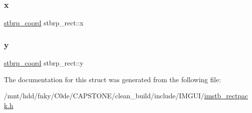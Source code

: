 \subsubsection{\texorpdfstring{x}{x}}
{\footnotesize\ttfamily \hyperlink{imstb__rectpack_8h_a4a396a45893c12de32e2d598abd6b302}{stbrp\+\_\+coord} stbrp\+\_\+rect\+::x}

\mbox{\label{structstbrp__rect_ae3034c1fbf86043b568f5a4dddf946fa}} 
\subsubsection{\texorpdfstring{y}{y}}
{\footnotesize\ttfamily \hyperlink{imstb__rectpack_8h_a4a396a45893c12de32e2d598abd6b302}{stbrp\+\_\+coord} stbrp\+\_\+rect\+::y}



The documentation for this struct was generated from the following file\+:\begin{DoxyCompactItemize}
\item 
/mnt/hdd/fnky/\+C0de/\+C\+A\+P\+S\+T\+O\+N\+E/clean\+\_\+build/include/\+I\+M\+G\+U\+I/\hyperlink{imstb__rectpack_8h}{imstb\+\_\+rectpack.\+h}\end{DoxyCompactItemize}

